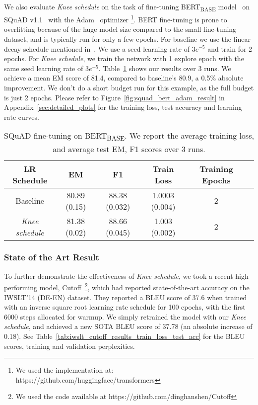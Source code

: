 \documentclass[twoside,11pt]{article}
\newcommand{\lrschedule}{\textit{Knee schedule}}
\begin{document}
We also evaluate \lrschedule{} on the task of fine-tuning BERT\textsubscript{BASE} model~\cite{devlin2018bert} on SQuAD v1.1~\cite{rajpurkar2016squad} with the Adam~\cite{kingma2014adam} optimizer \footnote{We used the implementation at: https://github.com/huggingface/transformers}. BERT fine-tuning is prone to overfitting because of the huge model size compared to the small fine-tuning dataset, and is typically run for only a few epochs. For baseline we use the linear decay schedule mentioned in~\cite{devlin2018bert}. We use a seed learning rate of $3e^{-5}$ and train for 2 epochs. For \lrschedule{}, we train the network with 1 explore epoch with the same seed learning rate of $3e^{-5}$. Table~\ref{tab:squad_results} shows our results over 3 runs. We achieve a mean EM score of 81.4, compared to baseline's 80.9, a 0.5\% absolute improvement. We don't do a short budget run for this example, as the full budget is just 2 epochs. Please refer to Figure~\ref{fig:squad_bert_adam_result} in Appendix~\ref{sec:detailed_plots} for the training loss, test accuracy and learning rate curves.

\begin{table}[h]
\small
\centering
\caption{SQuAD fine-tuning on BERT\textsubscript{BASE}. We report the average training loss, and average test EM, F1 scores over 3 runs.}
\label{tab:squad_results}
{\setlength{\extrarowheight}{1pt}\begin{tabular}{cccccc}
  \toprule
  LR Schedule & EM  & F1 & Train Loss & Training Epochs \\
  \midrule
  Baseline   & 80.89 (0.15) & 88.38 (0.032) & 1.0003 (0.004) & 2\\
  \lrschedule{}{}   & 81.38 (0.02) & 88.66 (0.045) & 1.003 (0.002) & 2 \\
  \bottomrule
\end{tabular}}

\end{table}


\subsubsection{State of the Art Result}
To further demonstrate the effectiveness of \lrschedule{}, we took a recent high performing model, Cutoff~\citep{shen2020simple}\footnote{We used the code available at https://github.com/dinghanshen/Cutoff}, which had reported state-of-the-art accuracy on the IWSLT'14 (DE-EN) dataset. They reported a BLEU score of 37.6 when trained with an inverse square root learning rate schedule for 100 epochs, with the first 6000 steps allocated for warmup. We simply retrained the model with our \lrschedule{}, and achieved a new SOTA BLEU score of 37.78 (an absolute increase of 0.18). See Table~\ref{tab:iwslt_cutoff_results_train_loss_test_acc} for the BLEU scores, training and validation perplexities.
\end{document}
